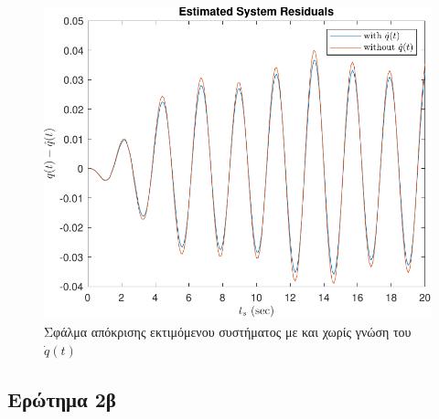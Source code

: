\documentclass[a4paper,12pt]{article}
\begin{document}
\begin{figure}
    \centering
    \includegraphics[width=0.5\linewidth]{plot/task2_residuals.pdf}
    \caption{Σφάλμα απόκρισης εκτιμόμενου συστήματος με και χωρίς γνώση του $\dot{q}(t)$}
    \label{fig:task2_residuals}
\end{figure}

\subsection*{Ερώτημα 2β}
\end{document}
